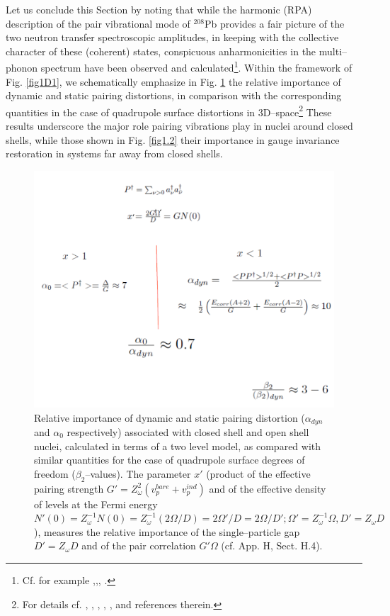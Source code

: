 Let us conclude this Section by noting that while the harmonic (RPA) description of the pair vibrational mode of $^{208}$Pb provides a fair picture of the two neutron transfer spectroscopic amplitudes, in keeping with the collective character of these (coherent) states, conspicuous anharmonicities in the multi--phonon spectrum have been observed and calculated\footnote{Cf. for example \cite{Flynn:72},\cite{Lanford:73},\cite{Bortignon:78}, \cite{Clark:06}.}. Within the framework of Fig. \ref{fig1D1}, we schematically emphasize in Fig. \ref{fig1_E8} the relative importance of dynamic and static pairing distortions, in comparison with the corresponding quantities in the case of quadrupole surface distortions in 3D--space\footnote{For details cf. \cite{Bes:77}, \cite{Broglia:68}, \cite{Bes:88},\cite{Barranco:87a} \cite{Shimizu:89}, \cite{Shimizu:13}, \cite{Vaquero:13} and references therein.}  These results underscore the major role pairing vibrations play in nuclei around closed shells, while those shown in Fig. \ref{fig1.2} their importance in gauge invariance restoration in systems far away from closed shells.
  \begin{figure}
  \centerline{\includegraphics*[width=\textwidth,angle=0]{nutshell/figs/fig1E8.pdf}}
  \caption{Relative importance of dynamic and static pairing distortion ($\alpha_{dyn}$ and $\alpha_0$ respectively) associated with closed shell and open shell  nuclei, calculated in terms of a two level model, as compared with similar quantities for the case of quadrupole surface degrees of freedom ($\beta_2$--values). The parameter $x'$ (product of the effective pairing strength $G'=Z_\omega^2(v_p^{bare}+v_p^{ind})$ and of the effective density of levels at the Fermi energy $N'(0)=Z_\omega^{-1}N(0)=Z^{-1}_\omega(2\Omega/D)=2\Omega'/D=2\Omega/D';\Omega'=Z_\omega^{-1}\Omega,D'=Z_\omega D$), measures the relative importance of the single--particle gap $D'=Z_\omega D$ and of the pair correlation $G'\Omega$ (cf. \cite{Brink:05} App. H, Sect. H.4).}\label{fig1_E8}
  \end{figure}
